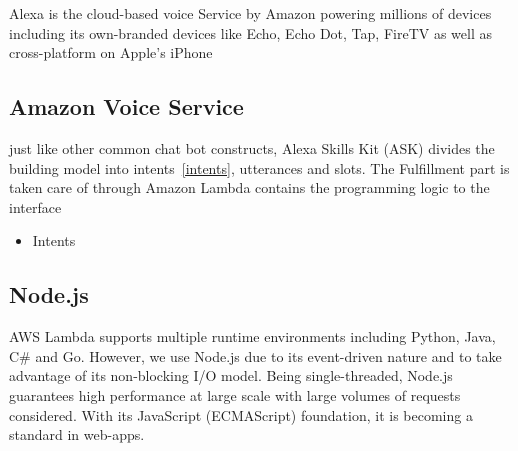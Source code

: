 Alexa is the cloud-based voice Service by Amazon powering millions of devices  including its own-branded devices like Echo, Echo Dot, Tap, FireTV as well as cross-platform on Apple's iPhone
\subsection{Amazon Voice Service}
just like other common chat bot constructs, Alexa Skills Kit (ASK) divides the building model into intents~\ref{intents}, utterances and slots. The Fulfillment part is taken care of through Amazon Lambda contains the programming  logic to the interface
\begin{itemize}
	\item Intents
	\
\end{itemize}

\subsection{Node.js}

AWS Lambda supports multiple runtime environments including Python, Java, C\# and Go. However, we use Node.js due to its event-driven nature and to take advantage of its non-blocking I/O model. Being single-threaded, Node.js guarantees high performance at large scale with large volumes of requests considered. With its JavaScript (ECMAScript) foundation, it is becoming a standard in web-apps. 

